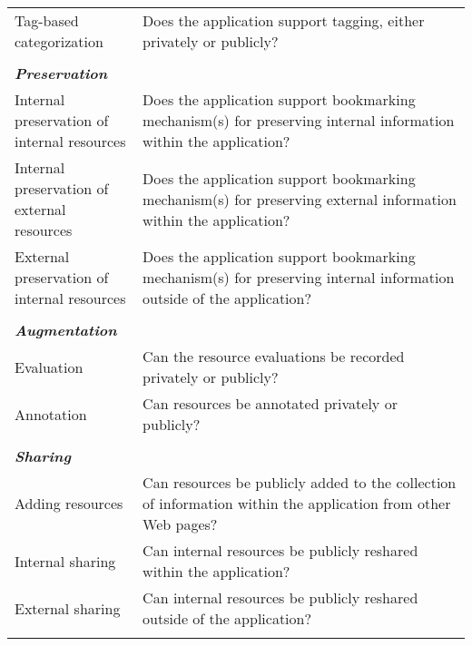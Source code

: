 \documentclass{casconpaper}
\begin{document}
{{\begin{table*}[htbp]
\begin{tabular}{|p{0.28\linewidth}|p{0.72\linewidth}|}
Tag-based categorization               & Does the application support tagging, either privately or publicly?                                                  \\
&\\
\emph{\textbf{Preservation}}                   &                                                                                                           \\
Internal preservation of internal resources       & Does the application support bookmarking mechanism(s) for preserving internal information within the application?        \\
Internal preservation of external resources       & Does the application support bookmarking mechanism(s) for preserving external information within the application?        \\
External preservation of internal resources      & Does the application support bookmarking mechanism(s) for preserving internal information outside of the application? \\ 
&\\
\emph{\textbf{Augmentation}}            &                                                                                                           \\
Evaluation                   & Can the resource evaluations be recorded privately or publicly? \\
Annotation                   & Can resources be annotated privately or publicly?                                                                               \\    
&\\        
\emph{\textbf{Sharing}}            &                                                                                                           \\
Adding resources             & Can resources be publicly added to the collection of information within the application from other Web pages?     \\
Internal sharing         & Can internal resources be publicly reshared within the application?         \\ 
External sharing          & Can internal resources be publicly reshared outside of the application?         \\ 
&\\           
\hline
\end{tabular}
\end{table*}

}}
\end{document}
